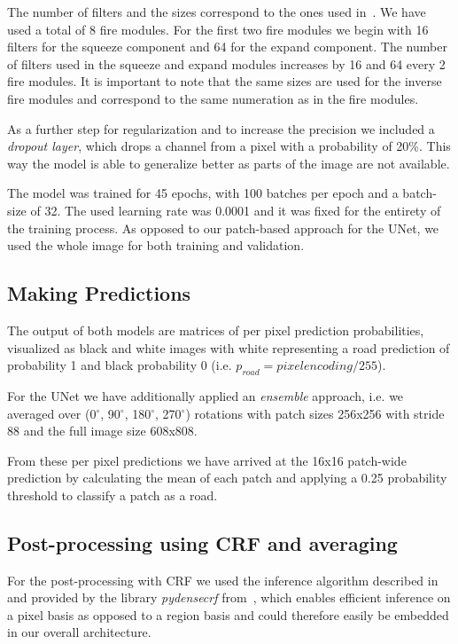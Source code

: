 \documentclass[10pt,conference,compsocconf]{IEEEtran}
\begin{document}
The number of filters and the sizes correspond to the ones used in~\cite{CoRR1}. We have used a total of 8 fire modules. For the first two fire modules we begin with 16 filters for the squeeze component and 64 for the expand component. The number of filters used in the squeeze and expand modules increases by 16 and 64 every 2 fire modules. It is important to note that the same sizes are used for the inverse fire modules and correspond to the same numeration as in the fire modules.

As a further step for regularization and to increase the precision we included a \textit{dropout layer}, which drops a channel from a pixel with a probability of 20\%. This way the model is able to generalize better as parts of the image are not available.

The model was trained for 45 epochs, with 100 batches per epoch and a batch-size of 32. The used learning rate was 0.0001 and it was fixed for the entirety of the training process. As opposed to our patch-based approach for the UNet, we used the whole image for both training and validation.

\subsection{Making Predictions}
\label{sec:predictions}
The output of both models are matrices of per pixel prediction probabilities, visualized as black and white images with white representing a road prediction of probability 1 and black probability 0 (i.e. $p_{road} = pixel encoding/255$).

For the UNet we have additionally applied an \textit{ensemble} approach, i.e. we averaged over (0$^{\circ}$, 90$^{\circ}$, 180$^{\circ}$, 270$^{\circ}$) rotations with patch sizes 256x256 with stride 88 and the full image size 608x808.

From these per pixel predictions we have arrived at the 16x16 patch-wide prediction by calculating the mean of each patch and applying a 0.25 probability threshold to classify a patch as a road.

\subsection{Post-processing using CRF and averaging}
For the post-processing with CRF we used the inference algorithm described in~\cite{NIPS2011_4296} and provided by the library \textit{pydensecrf} from~\cite{PydenseGL}, which enables efficient inference on a pixel basis as opposed to a region basis and could therefore easily be embedded in our overall architecture.
\end{document}
